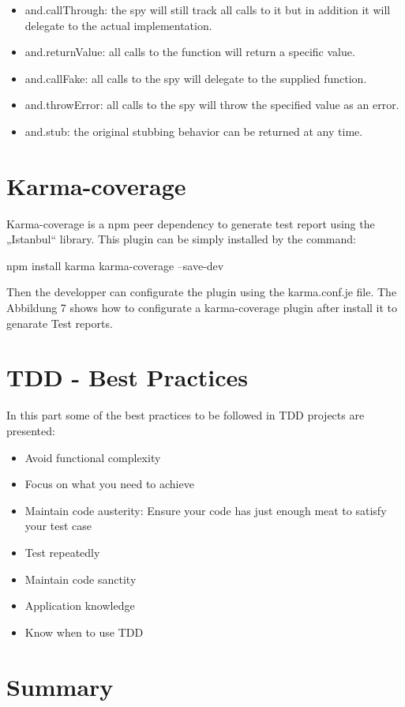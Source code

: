 \documentclass[11pt]{article}
\begin{document}
\begin{itemize}
\item and.callThrough: the spy will still track all calls to it but in addition it will delegate to the actual implementation.
\item and.returnValue: all calls to the function will return a specific value.
\item and.callFake: all calls to the spy will delegate to the supplied function.
\item and.throwError: all calls to the spy will throw the specified value as an error.
\item and.stub: the original stubbing behavior can be returned at any time.
\end{itemize}

\section{Karma-coverage}

Karma-coverage is a npm peer dependency to generate test report using the „Istanbul“ library. This plugin can be simply installed by the command:

\textdollar{} npm install karma karma-coverage --save-dev

Then the developper can configurate the plugin using the karma.conf.je file. The Abbildung 7 shows how to configurate a karma-coverage plugin after install it to genarate Test reports.

\section{TDD - Best Practices}
In this part some of the best practices to be followed in TDD projects are presented:

\begin{itemize}
\item Avoid functional complexity
\item Focus on what you need to achieve
\item Maintain code austerity: Ensure your code has just enough meat to satisfy your test case
\item Test repeatedly
\item Maintain code sanctity
\item Application knowledge
\item Know when to use TDD
\end{itemize}

\section{Summary}
\end{document}
